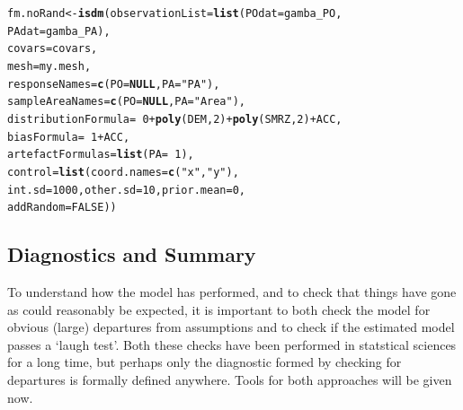 \documentclass[article,shortnames,nojss]{jss}\usepackage[]{graphicx}\usepackage[]{xcolor}
\makeatletter
\newcommand{\hlnum}[1]{\textcolor[rgb]{0.686,0.059,0.569}{#1}}%
\newcommand{\hlstr}[1]{\textcolor[rgb]{0.192,0.494,0.8}{#1}}%
\newcommand{\hlopt}[1]{\textcolor[rgb]{0,0,0}{#1}}%
\newcommand{\hlstd}[1]{\textcolor[rgb]{0.345,0.345,0.345}{#1}}%
\newcommand{\hlkwa}[1]{\textcolor[rgb]{0.161,0.373,0.58}{\textbf{#1}}}%
\newcommand{\hlkwb}[1]{\textcolor[rgb]{0.69,0.353,0.396}{#1}}%
\newcommand{\hlkwc}[1]{\textcolor[rgb]{0.333,0.667,0.333}{#1}}%
\newcommand{\hlkwd}[1]{\textcolor[rgb]{0.737,0.353,0.396}{\textbf{#1}}}%
\newenvironment{kframe}{%
 \def\at@end@of@kframe{}%
 \ifinner\ifhmode%
  \def\at@end@of@kframe{\end{minipage}}%
  \begin{minipage}{\columnwidth}%
 \fi\fi%
 \def\FrameCommand##1{\hskip\@totalleftmargin \hskip-\fboxsep
 \colorbox{shadecolor}{##1}\hskip-\fboxsep
     \hskip-\linewidth \hskip-\@totalleftmargin \hskip\columnwidth}%
 \MakeFramed {\advance\hsize-\width
   \@totalleftmargin\z@ \linewidth\hsize
   \@setminipage}}%
 {\par\unskip\endMakeFramed%
 \at@end@of@kframe}
\newenvironment{knitrout}{}{} %
\makeatother
\begin{document}
\begin{knitrout}
\color{fgcolor}\begin{kframe}
\begin{alltt}
\hlstd{fm.noRand} \hlkwb{<-} \hlkwd{isdm}\hlstd{(} \hlkwc{observationList}\hlstd{=}\hlkwd{list}\hlstd{(} \hlkwc{POdat}\hlstd{=gamba_PO,}
                                         \hlkwc{PAdat}\hlstd{=gamba_PA),}
                   \hlkwc{covars}\hlstd{=covars,}
                   \hlkwc{mesh}\hlstd{=my.mesh,}
                   \hlkwc{responseNames}\hlstd{=}\hlkwd{c}\hlstd{(} \hlkwc{PO}\hlstd{=}\hlkwa{NULL}\hlstd{,} \hlkwc{PA}\hlstd{=}\hlstr{"PA"}\hlstd{),}
                   \hlkwc{sampleAreaNames}\hlstd{=}\hlkwd{c}\hlstd{(} \hlkwc{PO}\hlstd{=}\hlkwa{NULL}\hlstd{,} \hlkwc{PA}\hlstd{=}\hlstr{"Area"}\hlstd{),}
                   \hlkwc{distributionFormula}\hlstd{=}\hlopt{~}\hlnum{0}\hlopt{+}\hlkwd{poly}\hlstd{( DEM,} \hlnum{2}\hlstd{)} \hlopt{+} \hlkwd{poly}\hlstd{( SMRZ,}\hlnum{2}\hlstd{)} \hlopt{+} \hlstd{ACC,}
                   \hlkwc{biasFormula}\hlstd{=}\hlopt{~}\hlnum{1}\hlopt{+}\hlstd{ACC,}
                   \hlkwc{artefactFormulas}\hlstd{=}\hlkwd{list}\hlstd{(} \hlkwc{PA}\hlstd{=}\hlopt{~}\hlnum{1}\hlstd{),}
                   \hlkwc{control}\hlstd{=}\hlkwd{list}\hlstd{(} \hlkwc{coord.names}\hlstd{=}\hlkwd{c}\hlstd{(}\hlstr{"x"}\hlstd{,}\hlstr{"y"}\hlstd{),}
                                  \hlkwc{int.sd}\hlstd{=}\hlnum{1000}\hlstd{,} \hlkwc{other.sd}\hlstd{=}\hlnum{10}\hlstd{,} \hlkwc{prior.mean}\hlstd{=}\hlnum{0}\hlstd{,}
                                  \hlkwc{addRandom}\hlstd{=}\hlnum{FALSE}\hlstd{))}
\end{alltt}
\end{kframe}
\end{knitrout}
    
\subsection*{Diagnostics and Summary}
  
To understand how the model has performed, and to check that things have gone as could reasonably be expected, it is important to both check the model for obvious (large) departures from assumptions and to check if the estimated model passes a `laugh test'. Both these checks have been performed in statstical sciences for a long time, but perhaps only the diagnostic formed by checking for departures is formally defined anywhere. Tools for both approaches will be given now.
\end{document}
